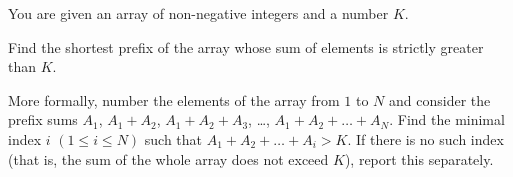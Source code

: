 You are given an array of non-negative integers and a number $K$.

Find the shortest prefix of the array whose sum of elements is strictly greater than $K$.

More formally, number the elements of the array from $1$ to $N$ and consider the prefix sums $A_1$, $A_1 + A_2$, $A_1 + A_2 + A_3$, \ldots, $A_1 + A_2 + \ldots + A_N$. Find the minimal index $i$ $(1 \le i \le N)$ such that $A_1 + A_2 + \ldots + A_i > K$. If there is no such index (that is, the sum of the whole array does not exceed $K$), report this separately.